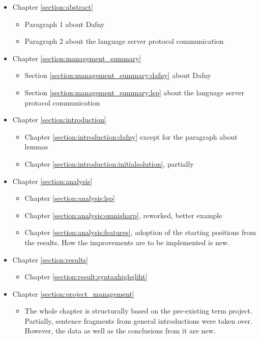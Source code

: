 \begin{itemize}
    \item Chapter \ref{section:abstract} 
        \begin{itemize}
            \item Paragraph 1 about Dafny
            \item Paragraph 2 about the language server protocol communication
        \end{itemize}

    \item Chapter \ref{section:management_summary} 
        \begin{itemize}
            \item Section \ref{section:management_summary:dafny} about Dafny
            \item Section \ref{section:management_summary:lsp} about the language server protocol communication
        \end{itemize}

    \item Chapter \ref{section:introduction} 
        \begin{itemize}
            \item Chapter \ref{section:introduction:dafny} except for the paragraph about lemmas
            \item Chapter \ref{section:introduction:initialsolution}, partially
        \end{itemize}

    \item Chapter \ref{section:analysis} 
        \begin{itemize}
            \item Chapter \ref{section:analysis:lsp}
            \item Chapter \ref{section:analysis:omnisharp}, reworked, better example
            \item Chapter \ref{section:analysis:features}, adoption of the starting positions from the results. How the improvements are to be implemented is new.
        \end{itemize}

    \item Chapter \ref{section:results} 
        \begin{itemize}
            \item Chapter \ref{section:result:syntaxhighgliht}
        \end{itemize}

    \item Chapter \ref{section:project_management} 
        \begin{itemize}
            \item The whole chapter is structurally based on the pre-existing term project.
            Partially, sentence fragments from general introductions were taken over.
            However, the data as well as the conclusions from it are new.
        \end{itemize}


\end{itemize}
